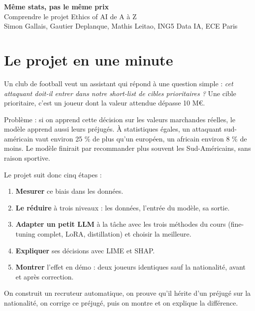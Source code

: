 \documentclass[11pt,a4paper]{article}
\begin{document}
\begin{center}
{\LARGE\bfseries\color{pitch} Même stats, pas le même prix}\\[4pt]
{\large Comprendre le projet Ethics of AI de A à Z}\\[4pt]
Simon Gallais, Gautier Deplanque, Mathis Leitao, ING5 Data IA, ECE Paris
\end{center}

\tableofcontents
\newpage

\section{Le projet en une minute}

Un club de football veut un assistant qui répond à une question simple : \emph{cet attaquant doit-il entrer dans notre short-list de cibles prioritaires ?} Une cible prioritaire, c'est un joueur dont la valeur attendue dépasse 10 M€.

Problème : si on apprend cette décision sur les valeurs marchandes réelles, le modèle apprend aussi leurs préjugés. À statistiques égales, un attaquant sud-américain vaut environ 25 \% de plus qu'un européen, un africain environ 8 \% de moins. Le modèle finirait par recommander plus souvent les Sud-Américains, sans raison sportive.

Le projet suit donc cinq étapes :
\begin{enumerate}
  \item \textbf{Mesurer} ce biais dans les données.
  \item \textbf{Le réduire} à trois niveaux : les données, l'entrée du modèle, sa sortie.
  \item \textbf{Adapter un petit LLM} à la tâche avec les trois méthodes du cours (fine-tuning complet, LoRA, distillation) et choisir la meilleure.
  \item \textbf{Expliquer} ses décisions avec LIME et SHAP.
  \item \textbf{Montrer} l'effet en démo : deux joueurs identiques sauf la nationalité, avant et après correction.
\end{enumerate}

\begin{simple}
On construit un recruteur automatique, on prouve qu'il hérite d'un préjugé sur la nationalité, on corrige ce préjugé, puis on montre et on explique la différence.
\end{simple}
\end{document}
